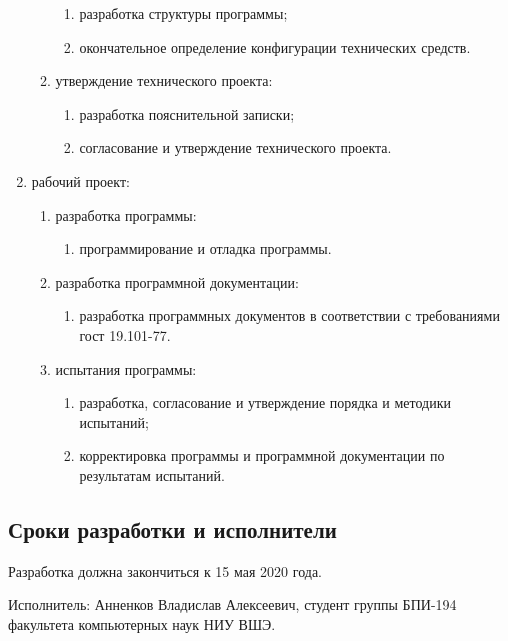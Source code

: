 \begin{enumerate}
\begin{enumerate}
\begin{enumerate}
            \item разработка структуры программы;
            \item окончательное определение конфигурации технических средств.
        \end{enumerate}
        \item утверждение технического проекта:
        \begin{enumerate}
            \item разработка пояснительной записки;
            \item согласование и утверждение технического проекта.
        \end{enumerate}
    \end{enumerate}
    \item рабочий проект:
    \begin{enumerate}
        \item разработка программы:
        \begin{enumerate}
            \item программирование и отладка программы.
        \end{enumerate}
        \item разработка программной документации:
        \begin{enumerate}
            \item разработка программных документов в соответствии с требованиями гост 19.101-77.
        \end{enumerate}
        \item испытания программы:
        \begin{enumerate}
            \item разработка, согласование и утверждение порядка и методики испытаний;
            \item корректировка программы и программной документации по результатам испытаний.
        \end{enumerate}
    \end{enumerate}
\end{enumerate}

\subsection{Сроки разработки и исполнители}
Разработка должна закончиться к 15 мая 2020 года.

Исполнитель: Анненков Владислав Алексеевич, студент группы БПИ-194 факультета компьютерных наук НИУ ВШЭ.